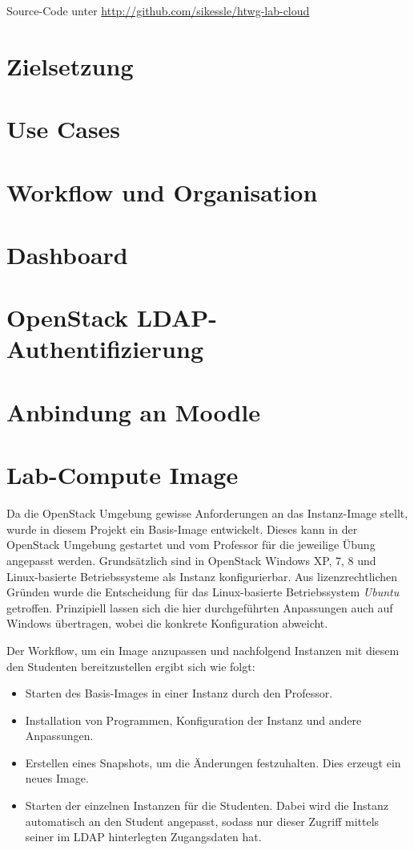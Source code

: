 Source-Code unter \url{http://github.com/sikessle/htwg-lab-cloud}

\section{Zielsetzung}

\section{Use Cases}

\section{Workflow und Organisation}

\section{Dashboard}

\section{OpenStack LDAP-Authentifizierung}

\section{Anbindung an Moodle}

\section{Lab-Compute Image}

Da die OpenStack Umgebung gewisse Anforderungen an das Instanz-Image stellt, wurde in diesem Projekt ein Basis-Image entwickelt. 
Dieses kann in der OpenStack Umgebung gestartet und vom Professor für die jeweilige Übung angepasst werden.
Grundsätzlich sind in OpenStack Windows XP, 7, 8 und Linux-basierte Betriebssysteme als Instanz konfigurierbar. 
Aus lizenzrechtlichen Gründen wurde die Entscheidung für das Linux-basierte Betriebssystem \emph{Ubuntu} getroffen. 
Prinzipiell lassen sich die hier durchgeführten Anpassungen auch auf Windows übertragen, wobei die konkrete Konfiguration abweicht.

Der Workflow, um ein Image anzupassen und nachfolgend Instanzen mit diesem den Studenten bereitzustellen ergibt sich wie folgt:

\begin{itemize}
\item Starten des Basis-Images in einer Instanz durch den Professor.
\item Installation von Programmen, Konfiguration der Instanz und andere Anpassungen.
\item Erstellen eines Snapshots, um die Änderungen festzuhalten. Dies erzeugt ein neues Image.
\item Starten der einzelnen Instanzen für die Studenten. Dabei wird die Instanz automatisch an den Student angepasst, sodass nur dieser Zugriff mittels seiner im LDAP hinterlegten Zugangsdaten hat.
\end{itemize}

